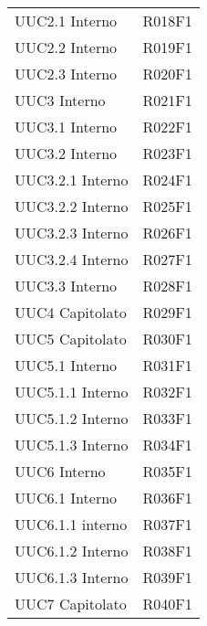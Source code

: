\documentclass[../analisi-dei-requisiti.tex]{subfiles}
\begin{document}
\begin{longtable}[H]{ p{4cm} | p{4cm} }
  UUC2.1 Interno                & R018F1                               \\
  UUC2.2 Interno                & R019F1                               \\
  UUC2.3 Interno                & R020F1                               \\
  UUC3 Interno                  & R021F1                               \\
  UUC3.1 Interno                & R022F1                               \\
  UUC3.2 Interno                & R023F1                               \\
  UUC3.2.1 Interno              & R024F1                               \\
  UUC3.2.2 Interno              & R025F1                               \\
  UUC3.2.3 Interno              & R026F1                               \\
  UUC3.2.4 Interno              & R027F1                               \\
  UUC3.3 Interno                & R028F1                               \\
  UUC4 Capitolato               & R029F1                               \\
  UUC5 Capitolato               & R030F1                               \\
  UUC5.1 Interno                & R031F1                               \\
  UUC5.1.1 Interno              & R032F1                               \\
  UUC5.1.2 Interno              & R033F1                               \\
  UUC5.1.3 Interno              & R034F1                               \\
  UUC6 Interno                  & R035F1                               \\
  UUC6.1 Interno                & R036F1                               \\
  UUC6.1.1 interno              & R037F1                               \\
  UUC6.1.2 Interno              & R038F1                               \\
  UUC6.1.3 Interno              & R039F1                               \\
  UUC7 Capitolato               & R040F1                               \\

\end{longtable}
\end{document}

